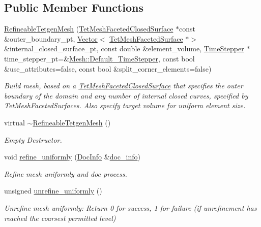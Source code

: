 \subsection*{Public Member Functions}
\begin{DoxyCompactItemize}
\item 
\hyperlink{classoomph_1_1RefineableTetgenMesh_a9ac439f3e1825013c81098e0fa35733b}{Refineable\+Tetgen\+Mesh} (\hyperlink{classoomph_1_1TetMeshFacetedClosedSurface}{Tet\+Mesh\+Faceted\+Closed\+Surface} $\ast$const \&outer\+\_\+boundary\+\_\+pt, \hyperlink{classoomph_1_1Vector}{Vector}$<$ \hyperlink{classoomph_1_1TetMeshFacetedSurface}{Tet\+Mesh\+Faceted\+Surface} $\ast$$>$ \&internal\+\_\+closed\+\_\+surface\+\_\+pt, const double \&element\+\_\+volume, \hyperlink{classoomph_1_1TimeStepper}{Time\+Stepper} $\ast$time\+\_\+stepper\+\_\+pt=\&\hyperlink{classoomph_1_1Mesh_a12243d0fee2b1fcee729ee5a4777ea10}{Mesh\+::\+Default\+\_\+\+Time\+Stepper}, const bool \&use\+\_\+attributes=false, const bool \&split\+\_\+corner\+\_\+elements=false)
\begin{DoxyCompactList}\small\item\em Build mesh, based on a \hyperlink{classoomph_1_1TetMeshFacetedClosedSurface}{Tet\+Mesh\+Faceted\+Closed\+Surface} that specifies the outer boundary of the domain and any number of internal closed curves, specified by Tet\+Mesh\+Faceted\+Surfaces. Also specify target volume for uniform element size. \end{DoxyCompactList}\item 
virtual \hyperlink{classoomph_1_1RefineableTetgenMesh_ac2ac6c6961647d0f332a6742f52dd27d}{$\sim$\+Refineable\+Tetgen\+Mesh} ()
\begin{DoxyCompactList}\small\item\em Empty Destructor. \end{DoxyCompactList}\item 
void \hyperlink{classoomph_1_1RefineableTetgenMesh_a5ddc94b2545c82bfb2795583f9b98db2}{refine\+\_\+uniformly} (\hyperlink{classoomph_1_1DocInfo}{Doc\+Info} \&\hyperlink{classoomph_1_1RefineableMeshBase_a266f8b2a1499cc2ae7b24b19813923ee}{doc\+\_\+info})
\begin{DoxyCompactList}\small\item\em Refine mesh uniformly and doc process. \end{DoxyCompactList}\item 
unsigned \hyperlink{classoomph_1_1RefineableTetgenMesh_add609c3184ffa1786e183f4c6dc24a57}{unrefine\+\_\+uniformly} ()
\begin{DoxyCompactList}\small\item\em Unrefine mesh uniformly\+: Return 0 for success, 1 for failure (if unrefinement has reached the coarsest permitted level) \end{DoxyCompactList}\item 
$$
\end{DoxyCompactItemize}
